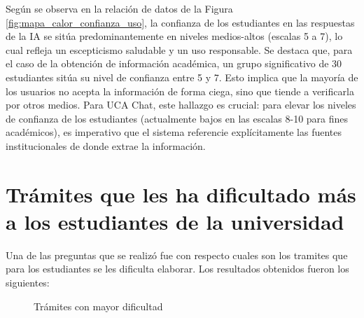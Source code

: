 {{Según se observa en la relación de datos de la Figura \ref{fig:mapa_calor_confianza_uso}, la confianza de los estudiantes en las respuestas de la IA se sitúa predominantemente en niveles medios-altos (escalas 5 a 7), lo cual refleja un escepticismo saludable y un uso responsable. Se destaca que, para el caso de la obtención de información académica, un grupo significativo de 30 estudiantes sitúa su nivel de confianza entre 5 y 7. Esto implica que la mayoría de los usuarios no acepta la información de forma ciega, sino que tiende a verificarla por otros medios. Para UCA Chat, este hallazgo es crucial: para elevar los niveles de confianza de los estudiantes (actualmente bajos en las escalas 8-10 para fines académicos), es imperativo que el sistema referencie explícitamente las fuentes institucionales de donde extrae la información.

\section{Trámites que les ha dificultado más a los estudiantes de la universidad}

Una de las preguntas que se realizó fue con respecto cuales son los tramites que para los estudiantes se les dificulta elaborar. Los resultados obtenidos fueron los siguientes: 

\begin{figure}[H]
    \centering
    \caption{Trámites con mayor dificultad}
    \label{fig:tramites_dificultad}
\end{figure}

}}
